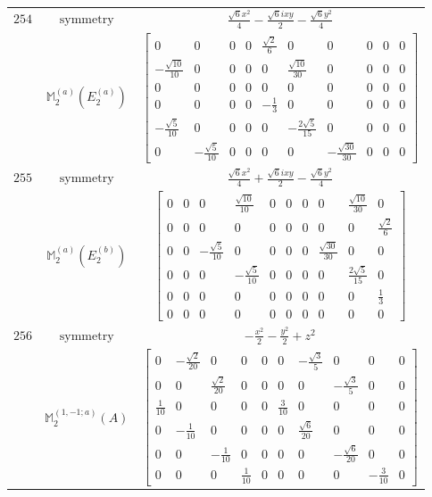 \documentclass[fleqn,8pt,landscape]{jsarticle}
\begin{document}
\begin{longtable}{ccc}
$ 254 $ & $ \text{symmetry} $ & $ \frac{\sqrt{6} x^{2}}{4} - \frac{\sqrt{6} i x y}{2} - \frac{\sqrt{6} y^{2}}{4} $ \\
$  $ & $ \mathbb{M}_{2}^{(a)}(E_{2}^{(a)}) $ & $ \begin{bmatrix} 0 & 0 & 0 & 0 & \frac{\sqrt{2}}{6} & 0 & 0 & 0 & 0 & 0 \\ - \frac{\sqrt{10}}{10} & 0 & 0 & 0 & 0 & \frac{\sqrt{10}}{30} & 0 & 0 & 0 & 0 \\ 0 & 0 & 0 & 0 & 0 & 0 & 0 & 0 & 0 & 0 \\ 0 & 0 & 0 & 0 & - \frac{1}{3} & 0 & 0 & 0 & 0 & 0 \\ - \frac{\sqrt{5}}{10} & 0 & 0 & 0 & 0 & - \frac{2 \sqrt{5}}{15} & 0 & 0 & 0 & 0 \\ 0 & - \frac{\sqrt{5}}{10} & 0 & 0 & 0 & 0 & - \frac{\sqrt{30}}{30} & 0 & 0 & 0 \end{bmatrix} $ \\ \hline
$ 255 $ & $ \text{symmetry} $ & $ \frac{\sqrt{6} x^{2}}{4} + \frac{\sqrt{6} i x y}{2} - \frac{\sqrt{6} y^{2}}{4} $ \\
$  $ & $ \mathbb{M}_{2}^{(a)}(E_{2}^{(b)}) $ & $ \begin{bmatrix} 0 & 0 & 0 & \frac{\sqrt{10}}{10} & 0 & 0 & 0 & 0 & \frac{\sqrt{10}}{30} & 0 \\ 0 & 0 & 0 & 0 & 0 & 0 & 0 & 0 & 0 & \frac{\sqrt{2}}{6} \\ 0 & 0 & - \frac{\sqrt{5}}{10} & 0 & 0 & 0 & 0 & \frac{\sqrt{30}}{30} & 0 & 0 \\ 0 & 0 & 0 & - \frac{\sqrt{5}}{10} & 0 & 0 & 0 & 0 & \frac{2 \sqrt{5}}{15} & 0 \\ 0 & 0 & 0 & 0 & 0 & 0 & 0 & 0 & 0 & \frac{1}{3} \\ 0 & 0 & 0 & 0 & 0 & 0 & 0 & 0 & 0 & 0 \end{bmatrix} $ \\ \hline
$ 256 $ & $ \text{symmetry} $ & $ - \frac{x^{2}}{2} - \frac{y^{2}}{2} + z^{2} $ \\
$  $ & $ \mathbb{M}_{2}^{(1,-1;a)}(A) $ & $ \begin{bmatrix} 0 & - \frac{\sqrt{2}}{20} & 0 & 0 & 0 & 0 & - \frac{\sqrt{3}}{5} & 0 & 0 & 0 \\ 0 & 0 & \frac{\sqrt{2}}{20} & 0 & 0 & 0 & 0 & - \frac{\sqrt{3}}{5} & 0 & 0 \\ \frac{1}{10} & 0 & 0 & 0 & 0 & \frac{3}{10} & 0 & 0 & 0 & 0 \\ 0 & - \frac{1}{10} & 0 & 0 & 0 & 0 & \frac{\sqrt{6}}{20} & 0 & 0 & 0 \\ 0 & 0 & - \frac{1}{10} & 0 & 0 & 0 & 0 & - \frac{\sqrt{6}}{20} & 0 & 0 \\ 0 & 0 & 0 & \frac{1}{10} & 0 & 0 & 0 & 0 & - \frac{3}{10} & 0 \end{bmatrix} $ \\ \hline

\end{longtable}
\end{document}
